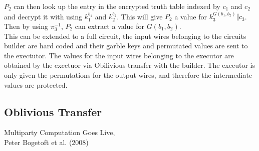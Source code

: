 \documentclass[a4paper,10pt]{article}
\begin{document}
		$P_2$ can then look up the entry in the encrypted truth table indexed by $c_1$ and $c_2$ and decrypt it with using $k_1^{b_1}$ and  $k_2^{b_2}$. This will give $P_2$ a value for $k_3^{G(b_1, b_2)} \Vert c_3$. Then by using $\pi_3^{-1}$, $P_2$ can extract a value for $G(b_1, b_2)$.\\

		This can be extended to a full circuit, the input wires belonging to the circuits builder are hard coded and their garble keys and permutated values are sent to the exectutor. The values for the input wires belonging to the executor are obtained by the exectuor via Obilivious transfer with the builder. The executor is only given the permutations for the output wires, and therefore the intermediate values are protected.



    \subsection{Oblivious Transfer} \label{OT_Intro}




\begin{thebibliography}{5}


Multiparty Computation Goes Live,\\
Peter Bogetoft et al. (2008)


\end{thebibliography}
\end{document}
